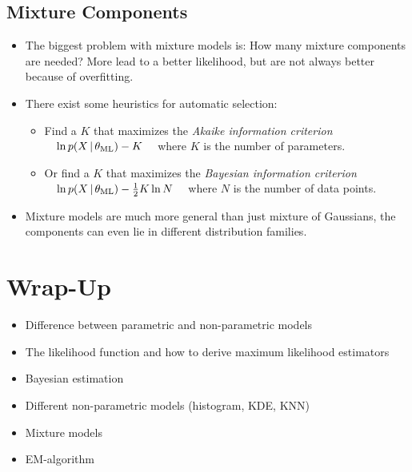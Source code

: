 		\subsection{Mixture Components}
			\begin{itemize}
				\item The biggest problem with mixture models is: How many mixture components are needed? More lead to a better likelihood, but are not always better because of overfitting.
				\item There exist some heuristics for automatic selection:
					\begin{itemize}
						\item Find a \(K\) that maximizes the \emph{Akaike information criterion} \( \quad\ln p(X \,\vert\, \theta_\textrm{ML}) - K\quad \) where \(K\) is the number of parameters.
						\item Or find a \(K\) that maximizes the \emph{Bayesian information criterion} \( \quad\ln p(X \,\vert\, \theta_\textrm{ML}) - \frac{1}{2} K \ln N\quad \) where \(N\) is the number of data points.
					\end{itemize}
				\item Mixture models are much more general than just mixture of Gaussians, the components can even lie in different distribution families.
			\end{itemize}
	
	\section{Wrap-Up}
		\begin{itemize}
			\item Difference between parametric and non-parametric models
			\item The likelihood function and how to derive maximum likelihood estimators
			\item Bayesian estimation
			\item Different non-parametric models (histogram, KDE, KNN)
			\item Mixture models
			\item EM-algorithm
		\end{itemize}

